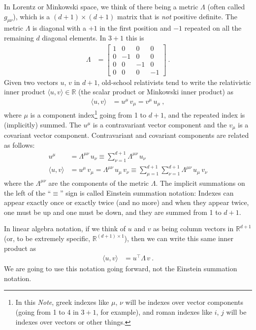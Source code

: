 \documentclass{article}
\newcommand{\inner}[2]{\langle{#1},{#2}\rangle}
\newcommand{\documentname}{\textsl{Note}}
\begin{document}
In Lorentz or Minkowski space, we think of there being a metric $\Lambda$ (often called $g_{\mu\nu}$), which is a $(d+1)\times(d+1)$ matrix that is \emph{not} positive definite.
The metric $\Lambda$ is diagonal with a $+1$ in the first position and $-1$ repeated on all the remaining $d$ diagonal elements.
In $3+1$ this is
\begin{align}
    \Lambda &= \begin{bmatrix}1 & 0 & 0 & 0\\
                              0 & -1 & 0 & 0\\
                              0 & 0 & -1 & 0\\
                              0 & 0 & 0 & -1\end{bmatrix} ~.
\end{align}
Given two vectors $u$, $v$ in $d+1$, old-school relativists tend to write the relativistic inner product $\inner{u}{v}\in\mathbb{R}$ (the scalar product or Minkowski inner product) as
\begin{align}
    \inner{u}{v} &= u^\mu\,v_\mu = v^\mu\,u_\mu ~,
\end{align}
where $\mu$ is a component index\footnote{In this \documentname{}, greek indexes like $\mu$, $\nu$ will be indexes over vector components (going from 1 to 4 in $3+1$, for example), and roman indexes like $i$, $j$ will be indexes over vectors or other things.} going from 1 to $d+1$, and the repeated index is (implicitly) summed.
The $u^\mu$ is a contravariant vector component and the $v_\mu$ is a covariant vector component.
Contravariant and covariant components are related as follows:
\begin{align}
    u^\mu &= \Lambda^{\mu\nu}\,u_\nu \equiv \sum_{\nu=1}^{d+1} \Lambda^{\mu\nu}\,u_\nu
    \\
    \inner{u}{v} &= u^\mu\,v_\mu = \Lambda^{\mu\nu}\,u_\mu\,v_\nu \equiv \sum_{\mu=1}^{d+1}\sum_{\nu=1}^{d+1} \Lambda^{\mu\nu}\,u_\mu\,v_\nu
\end{align}
where the $\Lambda^{\mu\nu}$ are the components of the metric $\Lambda$.
The implicit summations on the left of the ``$\equiv$'' sign is called Einstein summation notation: Indexes can appear exactly once or exactly twice (and no more) and when they appear twice, one must be up and one must be down, and they are summed from 1 to $d+1$.

In linear algebra notation, if we think of $u$ and $v$ as being column vectors in $\mathbb{R}^{d+1}$ (or, to be extremely specific, $\mathbb{R}^{(d+1)\times 1}$), then we can write this same inner product as
\begin{align}
    \inner{u}{v} &= u^\top\Lambda\,v ~.
\end{align}
We are going to use this notation going forward, not the Einstein summation notation.
\end{document}
